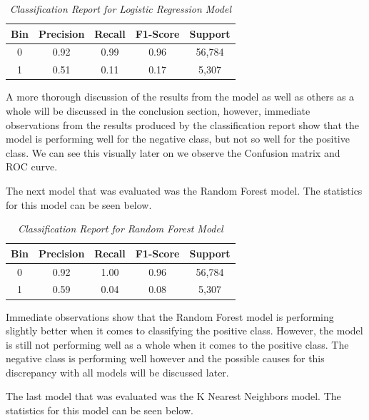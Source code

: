 \small{
    \begin{table}[h]
        \centering
        \begin{tabular}{|c|c|c|c|c|}
            \hline \textbf{Bin} & \textbf{Precision} & \textbf{Recall} & \textbf{F1-Score} & \textbf{Support} \\ \hline
            0 & 0.92 & 0.99 & 0.96 & 56,784 \\ \hline
            1 & 0.51 & 0.11 & 0.17 & 5,307 \\ \hline
        \end{tabular}
        \caption*{\textit{Classification Report for Logistic Regression Model}}
    \end{table}
}

A more thorough discussion of the results from the model as well as others as a whole will be discussed in the conclusion section, however, immediate observations from the results produced by the classification report show that the model is
performing well for the negative class, but not so well for the positive class. We can see this visually later on we observe the Confusion matrix and ROC curve.

The next model that was evaluated was the Random Forest model. The statistics for this model can be seen below.

\small{
    \begin{table}[h]
        \centering
        \begin{tabular}{|c|c|c|c|c|}
            \hline \textbf{Bin} & \textbf{Precision} & \textbf{Recall} & \textbf{F1-Score} & \textbf{Support} \\ \hline
            0 & 0.92 & 1.00 & 0.96 & 56,784 \\ \hline
            1 & 0.59 & 0.04 & 0.08 & 5,307 \\ \hline
        \end{tabular}
        \caption*{\textit{Classification Report for Random Forest Model}}
    \end{table}
}

Immediate observations show that the Random Forest model is performing slightly better when it comes to classifying the positive class. However, the model is still not performing well as a whole when it comes to the positive class. The negative class
is performing well however and the possible causes for this discrepancy with all models will be discussed later.

The last model that was evaluated was the K Nearest Neighbors model. The statistics for this model can be seen below.

